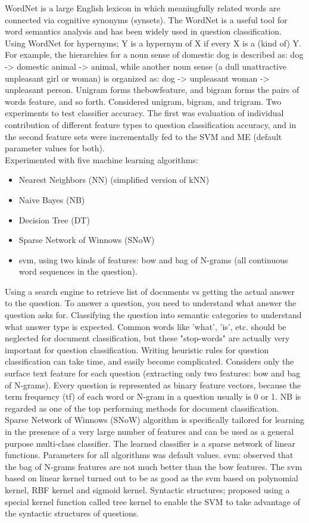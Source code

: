 WordNet is a large English lexicon in which meaningfully related words are connected via cognitive synonyms (synsets).  
The WordNet is a useful tool for word semantics analysis and has been widely used in question classification. 
Using WordNet for hypernyms; Y is a hypernym of X if every X is a (kind of) Y.
For example, the hierarchies for a noun sense of domestic dog is described as: 
dog -> domestic animal -> animal, 
while another noun sense (a dull unattractive unpleasant girl or woman)  is organized as:
dog -> unpleasant woman -> unpleasant person.
Unigram forms the\gls{bow}feature, and bigram forms the pairs of words feature, and so forth. 
Considered unigram, bigram, and trigram.
Two experiments to test classifier accuracy.
The first was evaluation of individual contribution of different feature types to question classification accuracy, 
and in the second feature sets were incrementally fed to the SVM and ME (default parameter values for both). \\
Experimented with five machine learning algorithms: 
\begin{itemize}
	\item Nearest Neighbors (NN) (simplified version of kNN)
	\item Naive Bayes (NB)
	\item Decision Tree (DT)
	\item Sparse Network of Winnows (SNoW)
	\item \gls{svm}, using two kinds of features: \gls{bow} and bag of N-grams (all continuous word sequences in the question).
\end{itemize}
Using a search engine to retrieve list of documents vs getting the actual answer to the question. 
To answer a question, you need to understand what answer the question asks for. 
Classifying the question into semantic categories to understand what answer type is expected. 
Common words like 'what', 'is', etc. should be neglected for document classification, but these "stop-words" are actually very important for question classification. 
Writing heuristic rules for question classification can take time, and easily become complicated.
Considers only the surface text feature for each question (extracting only two features: \gls{bow} and bag of N-grams).
Every question is represented as binary feature vectors, because the term frequency (tf) of each word or N-gram in a question usually is 0 or 1.
NB is regarded as one of the top performing methods for document classification. 
Sparse Network of Winnows (SNoW) algorithm is specifically tailored for learning in the presence of a very large number of features and can be used as a general purpose multi-class classifier. 
The learned classifier is a sparse network of linear functions. 
Parameters for all algorithms was default values. 
\gls{svm}: observed that the bag of N-grams features are not much better than the \gls{bow} features. 
The \gls{svm} based on linear kernel turned out to be as good as the \gls{svm} based on polynomial kernel, RBF kernel and sigmoid kernel.
Syntactic structures; proposed using a special kernel function called tree kernel to enable the SVM to take advantage of the syntactic structures of questions.
\cite{Zhang2003}


